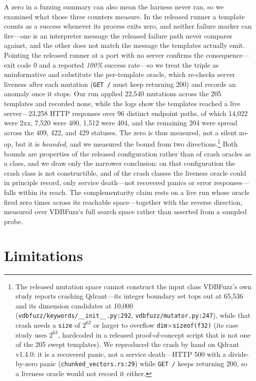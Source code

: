 \documentclass[acmsmall,screen,review,anonymous]{acmart}
\begin{document}
A zero in a fuzzing summary can also mean the harness never ran, so we examined what those three counters measure. In the released runner a template counts as a success whenever its process exits zero, and neither failure marker can fire---one is an interpreter message the released failure path never compares against, and the other does not match the message the templates actually emit. Pointing the released runner at a port with no server confirms the consequence---exit code 0 and a reported \emph{100\%} success rate---so we treat the triple as uninformative and substitute the per-template oracle, which re-checks server liveness after each mutation (\texttt{GET /} must keep returning 200) and records an anomaly once it stops. Our run applied 22{,}540 mutations across the 205 templates and recorded none, while the logs show the templates reached a live server---23{,}258 HTTP responses over 96 distinct endpoint paths, of which 14{,}022 were 2xx, 7{,}520 were 400, 1{,}512 were 404, and the remaining 204 were spread across the 409, 422, and 429 statuses. The zero is thus measured, not a silent no-op, but it is \emph{bounded}, and we measured the bound from two directions.\footnote{The released mutation space cannot construct the input class VDBFuzz's own study reports crashing Qdrant---its integer boundary set tops out at 65{,}536 and its dimension candidates at 10{,}000 (\texttt{vdbfuzz/keywords/\_\_init\_\_.py:292}, \texttt{vdbfuzz/mutator.py:247}), while that crash needs a \texttt{size} of $2^{62}$ or larger to overflow \texttt{dim}$\times$\texttt{sizeof(f32)} (its case study uses $2^{63}$, hardcoded in a released proof-of-concept script that is not one of the 205 swept templates). We reproduced the crash by hand on Qdrant v1.4.0: it is a recovered panic, not a service death---HTTP 500 with a divide-by-zero panic (\texttt{chunked\_vectors.rs:29}) while \texttt{GET /} keeps returning 200, so a liveness oracle would not record it either.} Both bounds are properties of the released configuration rather than of crash oracles as a class, and we draw only the narrower conclusion: on that configuration the crash class is not constructible, and of the crash classes the liveness oracle could in principle record, only service death---not recovered panics or error responses---falls within its reach. The complementarity claim rests on a live run whose oracle fired zero times across its reachable space---together with the reverse direction, measured over VDBFuzz's full search space rather than asserted from a sampled probe.

\section{Limitations}
\label{sec:limitations}
\end{document}
